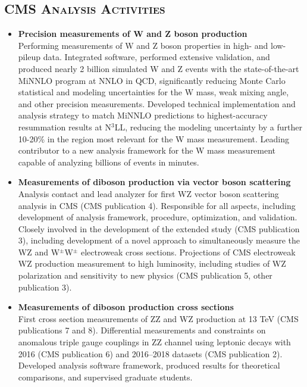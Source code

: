 \documentclass[10pt]{res} %
\begin{document}
\begin{resume}
\section{\textsc{CMS Analysis Activities}}
\begin{itemize}
  \item\textbf{{Precision measurements of W and Z boson production}} \\
    Performing measurements of W and Z boson properties in high- and low-pileup data.
    Integrated software, performed extensive validation, and produced nearly 2 billion simulated
    W and Z events with the state-of-the-art MiNNLO program at NNLO in QCD,
    significantly reducing Monte Carlo statistical and modeling uncertainties
    for the W mass, weak mixing angle, and other precision measurements.
    Developed technical implementation and analysis strategy to match MiNNLO predictions to
    highest-accuracy resummation results at N$^{3}$LL, 
    reducing the modeling uncertainty by a further 10-20\% in the region most relevant for the W mass measurement.
    Leading contributor to a new analysis framework for the W mass measurement capable of analyzing billions of events in minutes.
    
  \item\textbf{{Measurements of diboson production via vector boson scattering}} \\
    Analysis contact and lead analyzer for first WZ vector boson scattering analysis in CMS (CMS publication 4).
    Responsible for all aspects, 
    including development of analysis framework, procedure, optimization, and validation. 
    Closely involved in the development of the extended study (CMS publication 3), including 
    development of a novel approach
    to simultaneously measure the WZ and W$^{\pm}$W$^{\pm}$ electroweak cross sections.
    Projections of CMS electroweak WZ production measurement to high luminosity, including studies of
    WZ polarization and sensitivity to new physics (CMS publication 5, other publication 3). 

  \item\textbf{{Measurements of diboson production cross sections}} \\
    First cross section measurements
    of ZZ and WZ production at 13 TeV (CMS publications 7 and 8). 
    Differential measurements and constraints on anomalous
    triple gauge couplings in ZZ channel using leptonic decays
    with 2016 (CMS publication 6) and 2016--2018 datasets (CMS publication 2). 
    Developed analysis software framework, produced results for theoretical comparisons, 
    and supervised graduate students.
    

\end{itemize}
\end{resume}
\end{document}
